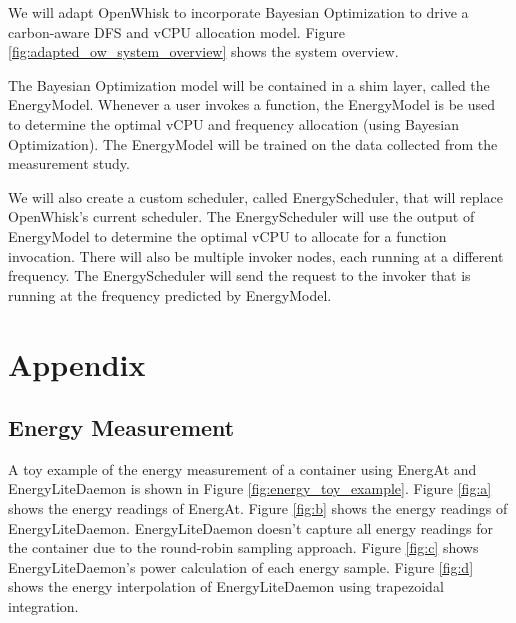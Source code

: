 \documentclass[times, 10pt,twocolumn]{article}
\begin{document}
We will adapt OpenWhisk to incorporate Bayesian Optimization to drive a carbon-aware DFS and vCPU allocation model. Figure \ref{fig:adapted_ow_system_overview} shows the system overview.

The Bayesian Optimization model will be contained in a shim layer, called the EnergyModel. Whenever a user invokes a function, the EnergyModel is be used to determine the optimal vCPU and frequency allocation (using Bayesian Optimization). The EnergyModel will be trained on the data collected from the measurement study.

We will also create a custom scheduler, called EnergyScheduler, that will replace OpenWhisk's current scheduler. The EnergyScheduler will use the output of EnergyModel to determine the optimal vCPU to allocate for a function invocation. There will also be multiple invoker nodes, each running at a different frequency. The EnergyScheduler will send the request to the invoker that is running at the frequency predicted by EnergyModel.






\appendix
\section{Appendix}
\subsection{Energy Measurement}
\label{appendix:energy_measurement}
A toy example of the energy measurement of a container using EnergAt and EnergyLiteDaemon is shown in Figure \ref{fig:energy_toy_example}. Figure \ref{fig:a} shows the energy readings of EnergAt. Figure \ref{fig:b} shows the energy readings of EnergyLiteDaemon. EnergyLiteDaemon doesn't capture all energy readings for the container due to the round-robin sampling approach. Figure \ref{fig:c} shows EnergyLiteDaemon's power calculation of each energy sample. Figure \ref{fig:d} shows the energy interpolation of EnergyLiteDaemon using trapezoidal integration.
\end{document}
